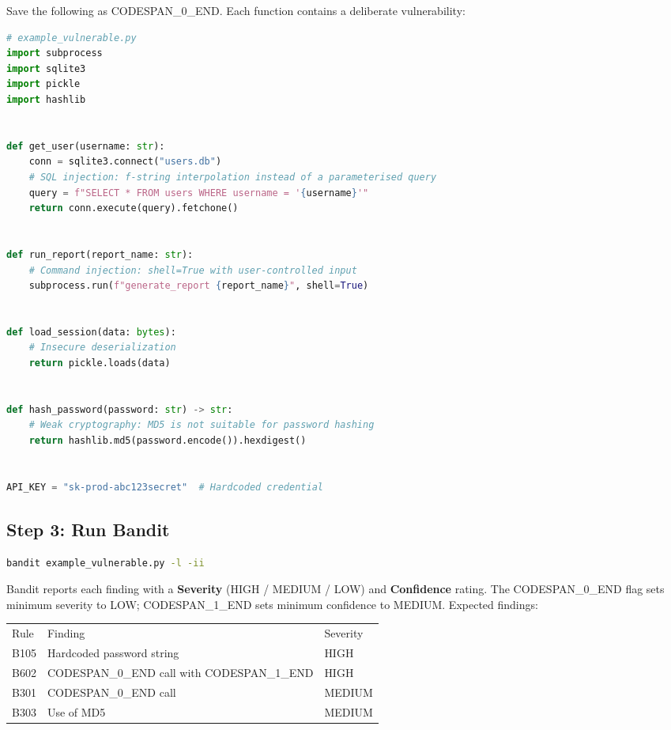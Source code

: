 \documentclass[11pt,a4paper]{book}
\begin{document}
Save the following as CODESPAN\_0\_END. Each function contains a deliberate vulnerability:

\begin{lstlisting}[language=Python]
# example_vulnerable.py
import subprocess
import sqlite3
import pickle
import hashlib


def get_user(username: str):
    conn = sqlite3.connect("users.db")
    # SQL injection: f-string interpolation instead of a parameterised query
    query = f"SELECT * FROM users WHERE username = '{username}'"
    return conn.execute(query).fetchone()


def run_report(report_name: str):
    # Command injection: shell=True with user-controlled input
    subprocess.run(f"generate_report {report_name}", shell=True)


def load_session(data: bytes):
    # Insecure deserialization
    return pickle.loads(data)


def hash_password(password: str) -> str:
    # Weak cryptography: MD5 is not suitable for password hashing
    return hashlib.md5(password.encode()).hexdigest()


API_KEY = "sk-prod-abc123secret"  # Hardcoded credential
\end{lstlisting}

\subsection{Step 3: Run Bandit}

\begin{lstlisting}[language=Bash]
bandit example_vulnerable.py -l -ii
\end{lstlisting}

Bandit reports each finding with a \textbf{Severity} (HIGH / MEDIUM / LOW) and \textbf{Confidence} rating. The CODESPAN\_0\_END flag sets minimum severity to LOW; CODESPAN\_1\_END sets minimum confidence to MEDIUM. Expected findings:

\begin{tabular}{lll}
\hline
Rule & Finding & Severity \\
B105 & Hardcoded password string & HIGH \\
B602 & CODESPAN\_0\_END call with CODESPAN\_1\_END & HIGH \\
B301 & CODESPAN\_0\_END call & MEDIUM \\
B303 & Use of MD5 & MEDIUM \\
\hline
\end{tabular}
\end{document}
